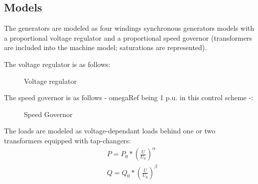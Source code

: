 \documentclass[a4paper, 12pt]{report}
\begin{document}
\subsection{Models}

The generators are modeled as four windings synchronous generators models with a proportional voltage regulator and a proportional speed governor (transformers are included into the machine model; saturations are represented).

The voltage regulator is as follows:
\begin{figure}[H]
\centering
{}
\caption{Voltage regulator}
\end{figure}

The speed governor is as follows - omegaRef being 1 p.u. in this control scheme -:
\begin{figure}[H]
\centering
{}
\caption{Speed Governor}
\end{figure}

The loads are modeled as voltage-dependant loads behind one or two transformers equipped with tap-changers:
\begin{equation*}
\begin{aligned}
& P = P_{0} * (\frac{U}{U_{0}})^\alpha \\
& Q = Q_{0} * (\frac{U}{U_{0}})^\beta
\end{aligned}
\label{Voltage-dependant load model}
\end{equation*}
\end{document}
